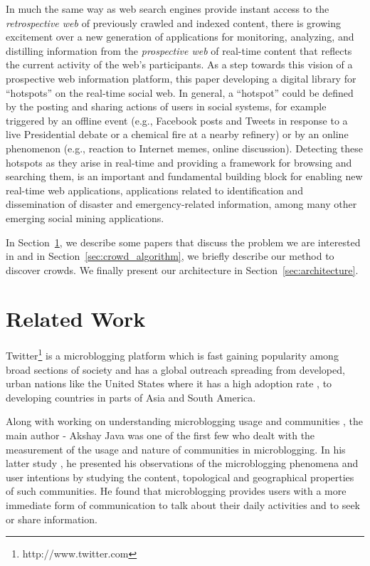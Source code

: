 \documentclass{sig-alternate}
\begin{document}
In much the same way as web search engines provide instant access to the
\textit{retrospective web} of previously crawled and indexed content, there is
growing excitement over a new generation of applications for monitoring,
analyzing, and distilling information from the \textit{prospective web} of
real-time content that reflects the current activity of the web's participants. As a step towards this vision of a prospective web information platform, this
paper developing a digital library for ``hotspots'' on the real-time social web.
In general, a ``hotspot'' could be defined by the posting and sharing actions of
users in social systems, for example triggered by an offline event (e.g.,
Facebook posts and Tweets in response to a live Presidential debate or a chemical
fire at a nearby refinery) or by an online phenomenon (e.g., reaction to Internet
memes, online discussion). Detecting these hotspots as they arise in real-time and providing a framework for browsing and searching them, is
an important and fundamental building block for enabling new real-time web
applications, applications related to identification and dissemination of
disaster and emergency-related information, among many other emerging social
mining applications.

In Section~\ref{sec:related_work}, we describe some papers that discuss the problem we are interested in and in Section~\ref{sec:crowd_algorithm}, we briefly describe our method to discover crowds. We finally present our architecture in Section~\ref{sec:architecture}.


\section{Related Work}
\label{sec:related_work}
Twitter\footnote{http://www.twitter.com} is a microblogging platform which is
fast gaining popularity\cite{Oreilly:2009} among broad sections of society and
has a global outreach spreading from developed, urban nations like the United
States where it has a high adoption rate \cite{Java:2007}, to developing
countries in parts of Asia and South America.

Along with working on understanding microblogging usage and communities
\cite{Java:2007}, the main author - Akshay Java was one of the first few who
dealt with the measurement of the usage and nature of communities in
microblogging. In his latter study \cite{Java:2008}, he presented his
observations of the microblogging phenomena and user intentions by studying the
content, topological and geographical properties of such communities. He found
that microblogging provides users with a more immediate form of communication
to talk about their daily activities and to seek or share information.
\end{document}
